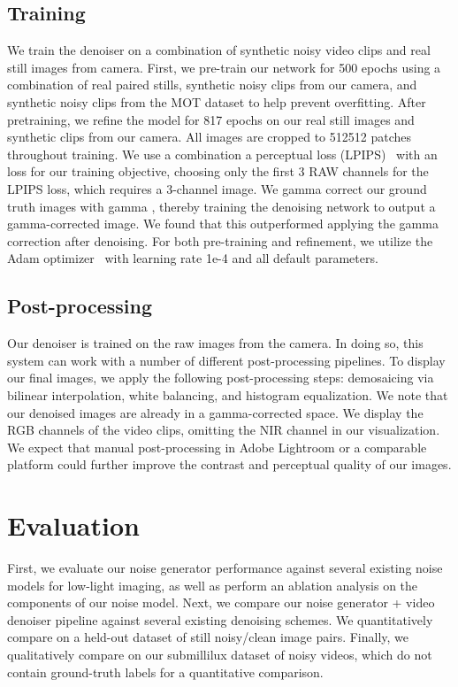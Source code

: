 \documentclass[final]{cvpr}
\begin{document}
\subsection{Training}
We train the denoiser on a combination of synthetic noisy video clips and real still images from camera. First, we pre-train our network for 500 epochs using a combination of real paired stills, synthetic noisy clips from our camera, and synthetic noisy clips from the MOT dataset to help prevent overfitting. After pretraining, we refine the model for 817 epochs on our real still images and synthetic clips from our camera. All images are cropped to 512512 patches throughout training. We use a combination a perceptual loss (LPIPS)~\cite{zhang2018unreasonable} with an  loss for our training objective, choosing only the first 3 RAW channels for the LPIPS loss, which requires a 3-channel image. We gamma correct our ground truth images with gamma , thereby training the denoising network to output a gamma-corrected image. We found that this outperformed applying the gamma correction after denoising. For both pre-training and refinement, we utilize the Adam optimizer~\cite{kingma2014adam} with learning rate 1e-4 and all default parameters. 

\subsection{Post-processing}
Our denoiser is trained on the raw images from the camera. In doing so, this system can work with a number of different post-processing pipelines. To display our final images, we apply the following post-processing steps: demosaicing via bilinear interpolation, white balancing, and histogram equalization. We note that our denoised images are already in a gamma-corrected space. We display the RGB channels of the video clips, omitting the NIR channel in our visualization. We expect that manual post-processing in Adobe Lightroom or a comparable platform could further improve the contrast and perceptual quality of our images.


\section{Evaluation}
\label{sec:results}
First, we evaluate our noise generator performance against several existing noise models for low-light imaging, as well as perform an ablation analysis on the components of our noise model. Next, we compare our noise generator + video denoiser pipeline against several existing denoising schemes. We quantitatively compare on a held-out dataset of still noisy/clean image pairs. Finally, we qualitatively compare on our submillilux dataset of noisy videos, which do not contain ground-truth labels for a quantitative comparison. 
\end{document}
